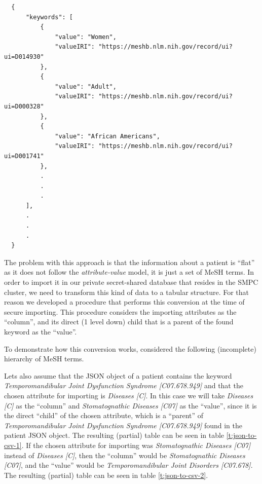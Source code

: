 {
\begin{verbatim}
  {
      "keywords": [
          {
              "value": "Women",
              "valueIRI": "https://meshb.nlm.nih.gov/record/ui?ui=D014930"
          },
          {
              "value": "Adult",
              "valueIRI": "https://meshb.nlm.nih.gov/record/ui?ui=D000328"
          },
          {
              "value": "African Americans",
              "valueIRI": "https://meshb.nlm.nih.gov/record/ui?ui=D001741"
          },
          .
          .
          .
      ],
      .
      .
      .
  }
\end{verbatim}
\label{sc:mesh-json}
}

The problem with this approach is that the information about a patient is ``flat'' as it does not follow the \textit{attribute\hyp value} model, it is just a set of MeSH terms.
In order to import it in our private secret\hyp shared database that resides in the SMPC cluster, we need to transform this kind of data to a tabular structure.
For that reason we developed a procedure that performs this conversion at the time of secure importing.
This procedure considers the importing attributes as the ``column'', and its direct (1 level down) child that is a parent of the found keyword as the ``value''.

To demonstrate how this conversion works, considered the following (incomplete) hierarchy of MeSH terms.

Lets also assume that the JSON object of a patient contains the keyword \textit{Temporomandibular Joint Dysfunction Syndrome [C07.678.949]} and that the chosen attribute for importing is \textit{Diseases [C]}.
In this case we will take \textit{Diseases [C]} as the ``column'' and \textit{Stomatognathic Diseases [C07]} as the ``value'', since it is the direct ``child'' of the chosen attribute, which is a ``parent'' of \textit{Temporomandibular Joint Dysfunction Syndrome [C07.678.949]} found in the patient JSON object. The resulting (partial) table can be seen in table \ref{t:json-to-csv-1}.
If the chosen attribute for importing was \textit{Stomatognathic Diseases [C07]} instead of \textit{Diseases [C]}, then the ``column'' would be \textit{Stomatognathic Diseases [C07]}, and the ``value'' would be \textit{Temporomandibular Joint Disorders [C07.678]}. The resulting (partial) table can be seen in table \ref{t:json-to-csv-2}.

